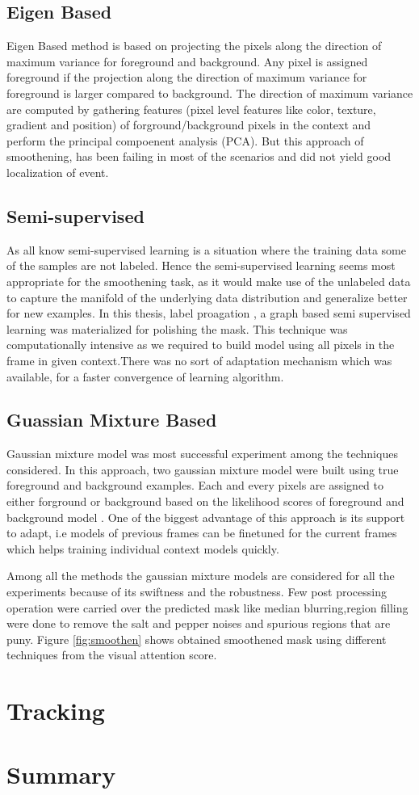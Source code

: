 \subsection{Eigen Based}
Eigen Based method is based on projecting the pixels along the direction of maximum variance for foreground and background. Any pixel is assigned foreground if the projection along the direction of maximum variance for foreground is larger compared to  background. The direction of maximum variance are computed by gathering features (pixel level features like color, texture, gradient and position) of forground/background pixels in the context and perform the principal compoenent analysis (PCA). But this approach of smoothening, has been failing in most of the scenarios and did not yield good localization of event.
\subsection{Semi-supervised}
As all know semi-supervised learning is a situation where the training data some of the samples are not labeled. Hence the semi-supervised learning seems most appropriate for the smoothening task, as it would make use of the unlabeled data to capture the manifold of the underlying data distribution and generalize better for new examples. In this thesis, label proagation \citep{labprop}, a graph based semi supervised learning was materialized for polishing the mask. This technique was computationally intensive as we required to build model using all pixels in the frame in given context.There was no sort of adaptation mechanism which was available, for a faster convergence of learning algorithm.
\subsection{Guassian Mixture Based}
Gaussian mixture model was  most successful experiment among the techniques considered.  In this approach, two gaussian mixture model were built using true foreground and background  examples. Each and every pixels are assigned to either forground or background based on the likelihood scores of foreground and background model . One of the biggest advantage of this approach is its support to adapt, i.e models of previous frames can be finetuned for the current frames which helps training individual context models quickly.
\par Among all the methods the gaussian mixture models are considered for all the experiments because of its swiftness and the robustness. Few post processing operation were carried over the predicted mask like median blurring,region filling were done to remove the salt and pepper noises and spurious regions that are puny. Figure \ref{fig:smoothen}  shows obtained smoothened mask using different techniques from the visual attention score.
\section{Tracking}
 
\section{Summary}

